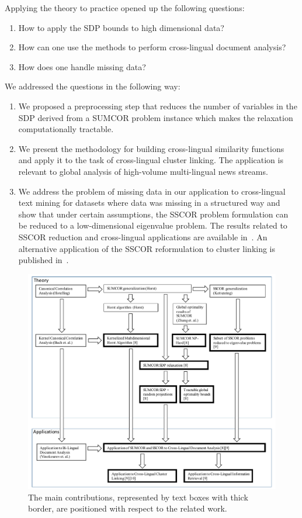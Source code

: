 Applying the theory to practice opened up the following questions:
\begin{enumerate}
\item How to apply the SDP bounds to high dimensional data?
\item How can one use the methods to perform cross-lingual document analysis?
\item How does one handle missing data?
\end{enumerate}
We addressed the questions in the following way:
\begin{enumerate}
\item We proposed a preprocessing step that reduces the number
of variables in the SDP derived from a SUMCOR problem instance which makes the relaxation computationally tractable. 

\item We present the methodology for building cross-lingual similarity functions and apply it
to the task of cross-lingual cluster linking. The application is relevant to global analysis of high-volume
multi-lingual news streams.

\item We address the problem of missing data in our application to cross-lingual text mining for datasets where
data was missing in a structured way and show that under certain assumptions, the SSCOR problem formulation
can be reduced to a low-dimensional eigenvalue problem. The results related to SSCOR reduction and
cross-lingual applications are available in~\cite{rupnikJAIR}.
An alternative application of the SSCOR reformulation to cluster linking is published in~\cite{Belyaeva201564}.
\end{enumerate}
\begin{figure}[t]
\centering
\includegraphics[width=1\textwidth]{figures/position_of_work.pdf}
\caption[The main contributions and related work]{The main contributions, represented by text boxes with thick border, are
positioned with respect to the related work.}
\label{fig:position_of_work}
\end{figure}

